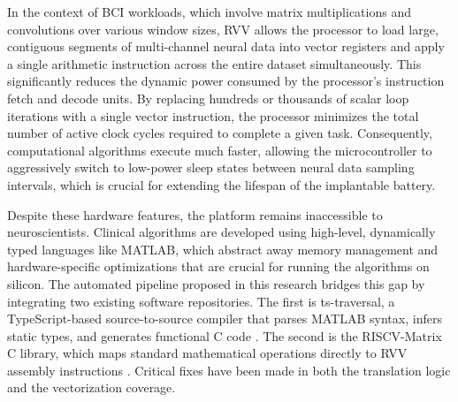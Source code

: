 In the context of BCI workloads, which involve matrix multiplications and convolutions over various window sizes, RVV allows the processor to load large, contiguous segments of multi-channel neural data into vector registers and apply a single arithmetic instruction across the entire dataset simultaneously. This significantly reduces the dynamic power consumed by the processor’s instruction fetch and decode units. By replacing hundreds or thousands of scalar loop iterations with a single vector instruction, the processor minimizes the total number of active clock cycles required to complete a given task. Consequently, computational algorithms execute much faster, allowing the microcontroller to aggressively switch to low-power sleep states between neural data sampling intervals, which is crucial for extending the lifespan of the implantable battery. 

Despite these hardware features, the platform remains inaccessible to neuroscientists. Clinical algorithms are developed using high-level, dynamically typed languages like MATLAB, which abstract away memory management and hardware-specific optimizations that are crucial for running the algorithms on silicon. The automated pipeline proposed in this research bridges this gap by integrating two existing software repositories. The first is ts-traversal, a TypeScript-based source-to-source compiler that parses MATLAB syntax, infers static types, and generates functional C code \cite{ts}. The second is the RISCV-Matrix C library, which maps standard mathematical operations directly to RVV assembly instructions \cite{riscvmatrix}. Critical fixes have been made in both the translation logic and the vectorization coverage.


